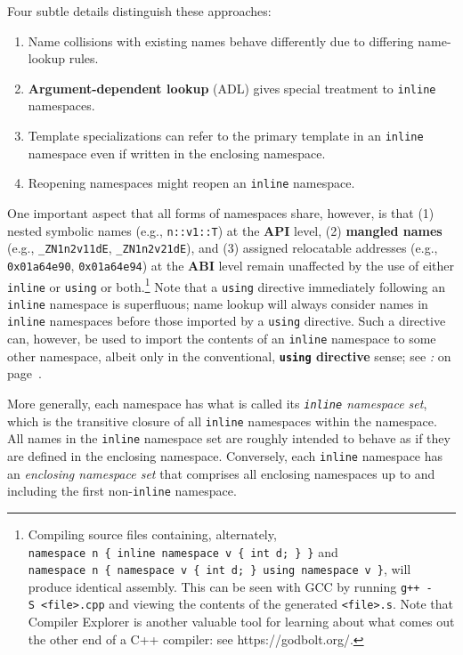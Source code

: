 \noindent Four subtle details distinguish these approaches:
\begin{enumerate}
\item{Name collisions with existing names behave differently due to differing name-lookup rules.}
\item{\textbf{Argument-dependent lookup} (ADL) gives special treatment to \texttt{inline} namespaces.}
\item{Template specializations can refer to the primary template in an \texttt{inline} namespace even if written in the enclosing namespace.}
\item{Reopening namespaces might reopen an \texttt{inline} namespace.}
\end{enumerate}
One important aspect that all forms of namespaces share, however, is
that (1) nested symbolic names (e.g., \texttt{n::v1::T}) at the
\textbf{API} level, (2) \textbf{mangled names} (e.g.,
\texttt{\_ZN1n2v11dE}, \texttt{\_ZN1n2v21dE}), and (3) assigned
relocatable addresses (e.g., \texttt{0x01a64e90}, \texttt{0x01a64e94})
at the \textbf{ABI} level remain unaffected by the use of either
\texttt{inline} or \texttt{using} or both.{\cprotect\footnote{Compiling
source files containing, alternately,
 \mbox{\texttt{namespace} \texttt{n} \texttt{\{} \texttt{inline} \texttt{namespace} \texttt{v} \texttt{\{} \texttt{int} \texttt{d;} \texttt{\}} \texttt{\}}}
  and
 \mbox{\texttt{namespace} \texttt{n} \texttt{\{} \texttt{namespace} \texttt{v} \texttt{\{} \texttt{int} \texttt{d;} \texttt{\}} \texttt{using} \texttt{namespace} \texttt{v} \texttt{\}}},
  will produce identical assembly. This can be seen with GCC by
  running \texttt{g++}~\texttt{-S}~\texttt{<file>.cpp} and viewing the
  contents of the generated \texttt{<file>.s}. Note that Compiler
  Explorer is another valuable tool for learning about what comes out
  the other end of a C++ compiler: see https://godbolt.org/.}} Note that
a \texttt{using} directive immediately following an \texttt{inline}
namespace is superfluous; name lookup will always consider names in
\texttt{inline} namespaces before those imported by a \texttt{using}
directive. Such a directive can, however, be used to import the contents
of an \texttt{inline} namespace to some other namespace, albeit only in
the conventional, \textbf{\texttt{using} directive} sense; see \textit{: } on page~\pageref{only-one-namespace-can-contain-any-given-inline-namespace}.

More generally, each namespace has what is called its
\emph{\texttt{inline} namespace set}, which is the transitive closure of
all \texttt{inline} namespaces within the namespace. All names in the
\texttt{inline} namespace set are roughly intended to behave as if they
are defined in the enclosing namespace. Conversely, each \texttt{inline}
namespace has an \emph{enclosing namespace set} that comprises all
enclosing namespaces up to and including the first non-\texttt{inline}
namespace.

